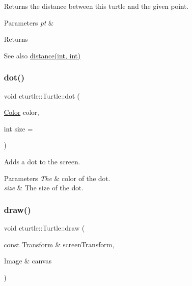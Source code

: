 Returns the distance between this turtle and the given point. 
\begin{DoxyParams}{Parameters}
{\em pt} & \\
\hline
\end{DoxyParams}
\begin{DoxyReturn}{Returns}

\end{DoxyReturn}
\begin{DoxySeeAlso}{See also}
\hyperlink{classcturtle_1_1Turtle_a4a6824b53f70323402d4e972f6da360c}{distance(int, int)} 
\end{DoxySeeAlso}
\mbox{\label{classcturtle_1_1Turtle_af33a02ec769c35671204abcc33050b0f}} 
\subsubsection{\texorpdfstring{dot()}{dot()}}
{\footnotesize\ttfamily void cturtle\+::\+Turtle\+::dot (\begin{DoxyParamCaption}\item[{\hyperlink{classcturtle_1_1Color}{Color}}]{color,  }\item[{int}]{size = {} }\end{DoxyParamCaption})\hspace{0.3cm}{\ttfamily [inline]}}



Adds a dot to the screen. 


\begin{DoxyParams}{Parameters}
{\em The} & color of the dot. \\
\hline
{\em size} & The size of the dot. \\
\hline
\end{DoxyParams}
\mbox{\label{classcturtle_1_1Turtle_aac46b43327830632ac8e505e9d9f3d5f}} 
\subsubsection{\texorpdfstring{draw()}{draw()}}
{\footnotesize\ttfamily void cturtle\+::\+Turtle\+::draw (\begin{DoxyParamCaption}\item[{const \hyperlink{classcturtle_1_1Transform}{Transform} \&}]{screen\+Transform,  }\item[{Image \&}]{canvas }\end{DoxyParamCaption})}



